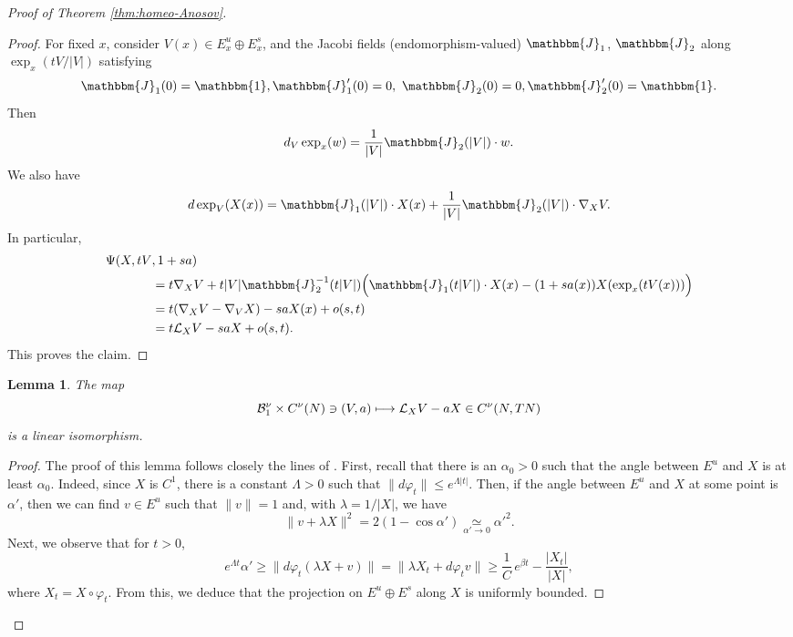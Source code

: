 \documentclass[10pt]{amsart}
\newcommand\mto{\mathchoice{\longmapsto}{\mapsto}{\mapsto}{\mapsto}}
\theoremstyle{plain}
\newtheorem{lemma}{Lemma}[section]
\theoremstyle{definition}
\begin{document}
\begin{proof}[Proof of Theorem \ref{thm:homeo-Anosov}]
\begin{proof}
For fixed $x$, consider $V(x) \in E^u_x\oplus E^s_x$, and the Jacobi fields (\ie endomorphism-valued) $\mathbbm{J}_1$, $\mathbbm{J}_2$ along $\exp_x(tV/|V|)$ satisfying
\[
\mathbbm{J}_1(0)= \mathbbm{1},\mathbbm{J}_1'(0)=0,\ \mathbbm{J}_2(0)=0,\mathbbm{J}_2'(0)=\mathbbm{1}.
\]
Then
\[
d_V \exp_x ( w) = \frac{1}{|V|}\mathbbm{J}_2(|V|)\cdot w .
\]
We also have
\[
d \exp_V(X(x)) = \mathbbm{J}_1(|V|)\cdot X(x) + \frac{1}{|V|}\mathbbm{J}_2(|V|)\cdot \nabla_X V.
\]
In particular,
\begin{align*}
\Psi(X,t V&, 1+ s a) \\
& = t\nabla_X V + t|V|\mathbbm{J}_2^{-1}(t|V|) \Big(\mathbbm{J}_1(t|V|)\cdot X(x) - (1+s a(x)) X(\exp_x( t V(x)))\Big)\\
&= t(\nabla_X V - \nabla_V X) - s a X(x) + o(s,t) \\
&= t\mathcal{L}_X V - s a X + o(s,t).
\end{align*}
This proves the claim.\end{proof}

\begin{lemma}
The map
\[
\mathcal{B}_1^\nu\times C^\nu (N) \ni (V,a) \mto \mathcal{L}_X V - a X \in C^\nu(N,TN)
\]
is a linear isomorphism.
\end{lemma}

\begin{proof}
The proof of this lemma follows closely the lines of \cite[Lem.\,A.7, p.\,597]{DeLaLlave-Marco-Moryon-86}. First, recall that there is an $\alpha_0>0$ such that the angle between $E^u$ and $X$ is at least $\alpha_0$. Indeed, since $X$ is $C^1$, there is a constant $\Lambda>0$ such that $\| d\varphi_t\| \leq e^{\Lambda |t|}$. Then, if the angle between $E^u$ and $X $ at some point is $\alpha'$, then we can find $v \in E^u$ such that $\|v\| = 1$ and, with $\lambda = 1/|X|$, we have
\[
\| v + \lambda X \|^2 = 2(1-\cos\alpha') \underset{\alpha'\to 0}\simeq \alpha'^2.
\]
Next, we observe that for $t>0$,
\[
e^{\Lambda t} \alpha' \geq \| d\varphi_t(\lambda X + v)\| = \| \lambda X_t + d\varphi_t v\| \geq \frac{1}{C}\,e^{\beta t} - \frac{|X_t|}{|X|},
\]
where $X_t = X \circ \varphi_t$. From this, we deduce that the projection on $E^u\oplus E^s$ along $X$ is uniformly bounded.


\end{proof}
\end{proof}
\end{document}
